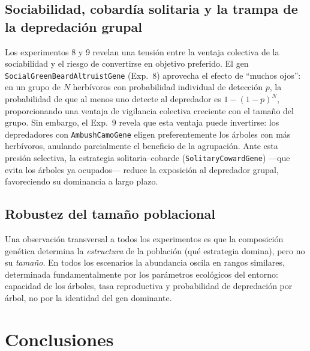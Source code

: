 \documentclass[11pt,a4paper]{article}
\begin{document}
\subsection{Sociabilidad, cobard\'ia solitaria y la trampa de la depredaci\'on grupal}

Los experimentos 8 y 9 revelan una tensi\'on entre la ventaja colectiva de la sociabilidad y el riesgo de convertirse en objetivo preferido. El gen \texttt{SocialGreenBeardAltruistGene} (Exp.~8) aprovecha el efecto de ``muchos ojos'': en un grupo de $N$ herb\'ivoros con probabilidad individual de detecci\'on $p$, la probabilidad de que al menos uno detecte al depredador es $1-(1-p)^N$, proporcionando una ventaja de vigilancia colectiva creciente con el tama\~no del grupo. Sin embargo, el Exp.~9 revela que esta ventaja puede invertirse: los depredadores con \texttt{AmbushCamoGene} eligen preferentemente los \'arboles con m\'as herb\'ivoros, anulando parcialmente el beneficio de la agrupaci\'on. Ante esta presi\'on selectiva, la estrategia solitaria--cobarde (\texttt{SolitaryCowardGene}) ---que evita los \'arboles ya ocupados--- reduce la exposici\'on al depredador grupal, favoreciendo su dominancia a largo plazo.

\subsection{Robustez del tama\~no poblacional}

Una observaci\'on transversal a todos los experimentos es que la composici\'on gen\'etica determina la \textit{estructura} de la poblaci\'on (qu\'e estrategia domina), pero no su \textit{tama\~no}. En todos los escenarios la abundancia oscila en rangos similares, determinada fundamentalmente por los par\'ametros ecol\'ogicos del entorno: capacidad de los \'arboles, tasa reproductiva y probabilidad de depredaci\'on por \'arbol, no por la identidad del gen dominante.

\section{Conclusiones}
\end{document}
